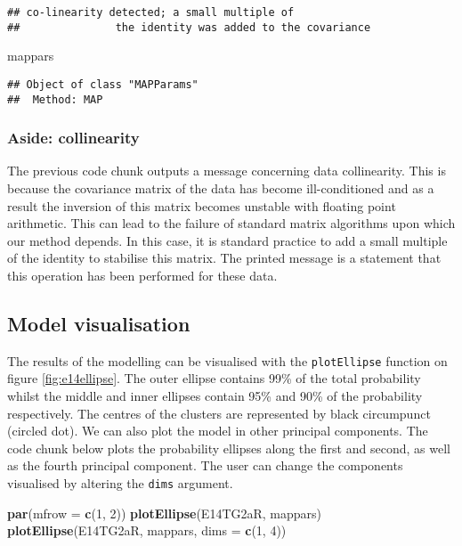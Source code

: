 \documentclass[]{article}
\newenvironment{Shaded}{\begin{snugshade}}{\end{snugshade}}
\newcommand{\KeywordTok}[1]{\textcolor[rgb]{0.13,0.29,0.53}{\textbf{{#1}}}}
\newcommand{\DataTypeTok}[1]{\textcolor[rgb]{0.13,0.29,0.53}{{#1}}}
\newcommand{\DecValTok}[1]{\textcolor[rgb]{0.00,0.00,0.81}{{#1}}}
\newcommand{\NormalTok}[1]{{#1}}
\begin{document}
\begin{verbatim}
## co-linearity detected; a small multiple of
##               the identity was added to the covariance
\end{verbatim}

\begin{Shaded}
\begin{Highlighting}[]
\NormalTok{mappars}
\end{Highlighting}
\end{Shaded}

\begin{verbatim}
## Object of class "MAPParams"
##  Method: MAP
\end{verbatim}

\subsubsection*{Aside: collinearity}\label{aside-collinearity}

The previous code chunk outputs a message concerning data collinearity.
This is because the covariance matrix of the data has become
ill-conditioned and as a result the inversion of this matrix becomes
unstable with floating point arithmetic. This can lead to the failure of
standard matrix algorithms upon which our method depends. In this case,
it is standard practice to add a small multiple of the identity to
stabilise this matrix. The printed message is a statement that this
operation has been performed for these data.

\subsection{Model visualisation}\label{model-visualisation}

The results of the modelling can be visualised with the
\texttt{plotEllipse} function on figure \ref{fig:e14ellipse}. The outer
ellipse contains 99\% of the total probability whilst the middle and
inner ellipses contain 95\% and 90\% of the probability respectively.
The centres of the clusters are represented by black circumpunct
(circled dot). We can also plot the model in other principal components.
The code chunk below plots the probability ellipses along the first and
second, as well as the fourth principal component. The user can change
the components visualised by altering the \texttt{dims} argument.

\begin{Shaded}
\begin{Highlighting}[]
\KeywordTok{par}\NormalTok{(}\DataTypeTok{mfrow =} \KeywordTok{c}\NormalTok{(}\DecValTok{1}\NormalTok{, }\DecValTok{2}\NormalTok{))}
\KeywordTok{plotEllipse}\NormalTok{(E14TG2aR, mappars)}
\KeywordTok{plotEllipse}\NormalTok{(E14TG2aR, mappars, }\DataTypeTok{dims =} \KeywordTok{c}\NormalTok{(}\DecValTok{1}\NormalTok{, }\DecValTok{4}\NormalTok{))}
\end{Highlighting}
\end{Shaded}
\end{document}
